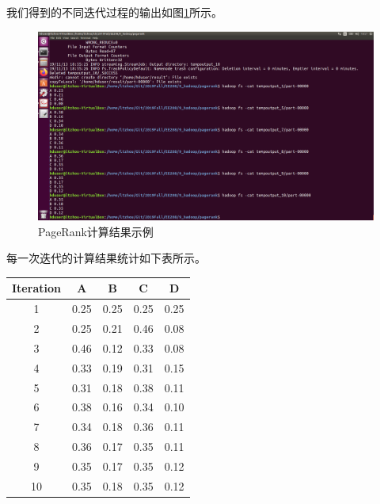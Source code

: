 \documentclass{article}
\begin{document}
我们得到的不同迭代过程的输出如图\ref{prres}所示。

\begin{figure}[htbp]
\centering
\includegraphics[width=14.5cm]{img/result.png}
\caption{PageRank计算结果示例}
\label{prres}
\end{figure}

每一次迭代的计算结果统计如下表所示。
\begin{center}
\begin{table}[]
\begin{tabular}{ccccc}
\hline
\textbf{Iteration} & \textbf{A} & \textbf{B} & \textbf{C} & \textbf{D} \\ \hline
1                  & 0.25       & 0.25       & 0.25       & 0.25       \\
2                  & 0.25       & 0.21       & 0.46       & 0.08       \\
3                  & 0.46       & 0.12       & 0.33       & 0.08       \\
4                  & 0.33       & 0.19       & 0.31       & 0.15       \\
5                  & 0.31       & 0.18       & 0.38       & 0.11       \\
6                  & 0.38       & 0.16       & 0.34       & 0.10       \\
7                  & 0.34       & 0.18       & 0.36       & 0.11       \\
8                  & 0.36       & 0.17       & 0.35       & 0.11       \\
9                  & 0.35       & 0.17       & 0.35       & 0.12       \\
10                 & 0.35       & 0.18       & 0.35       & 0.12       \\ \hline
\end{tabular}
\end{table}
\end{center}
\end{document}

